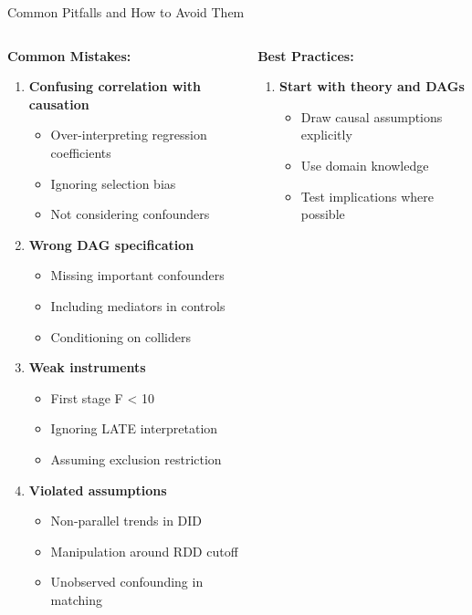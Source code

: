 \documentclass[aspectratio=169,11pt]{beamer}
\begin{document}
\begin{frame}{Common Pitfalls and How to Avoid Them}
\begin{columns}
\begin{column}{0.5\textwidth}
\textbf{Common Mistakes:}

\begin{enumerate}
\item \textbf{Confusing correlation with causation}
   \begin{itemize}
   \item Over-interpreting regression coefficients
   \item Ignoring selection bias
   \item Not considering confounders
   \end{itemize}

\item \textbf{Wrong DAG specification}
   \begin{itemize}
   \item Missing important confounders
   \item Including mediators in controls
   \item Conditioning on colliders
   \end{itemize}

\item \textbf{Weak instruments}
   \begin{itemize}
   \item First stage F < 10
   \item Ignoring LATE interpretation
   \item Assuming exclusion restriction
   \end{itemize}

\item \textbf{Violated assumptions}
   \begin{itemize}
   \item Non-parallel trends in DID
   \item Manipulation around RDD cutoff
   \item Unobserved confounding in matching
   \end{itemize}
\end{enumerate}
\end{column}
\begin{column}{0.5\textwidth}
\textbf{Best Practices:}

\begin{enumerate}
\item \textbf{Start with theory and DAGs}
   \begin{itemize}
   \item Draw causal assumptions explicitly
   \item Use domain knowledge
   \item Test implications where possible
   \end{itemize}


\end{enumerate}
\end{column}
\end{columns}
\end{frame}
\end{document}
